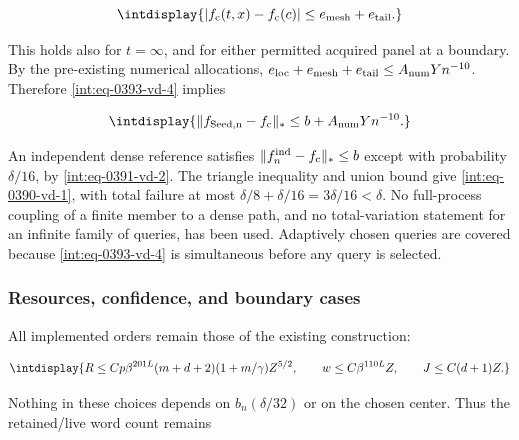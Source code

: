 \begingroup\renewcommand{\theHequation}{intdisplay.812}
\begin{equation*}
\intdisplay{
|f_{\rm c}(t,x)-f_{\rm c}(c)|\le e_{\rm mesh}+e_{\rm tail}.
}
\end{equation*}
\endgroup


This holds also for \(t=\infty\), and for either permitted acquired panel at a boundary. By the pre-existing numerical allocations, \(e_{\rm loc}+e_{\rm mesh}+e_{\rm tail} \le A_{\rm num}Yn^{-10}\). Therefore \eqref{int:eq-0393-vd-4} implies


\begingroup\renewcommand{\theHequation}{intdisplay.813}
\begin{equation*}
\intdisplay{
\|f_{\rm Seed,n}-f_{\rm c}\|_*
 \le b+A_{\rm num}Yn^{-10}.
}
\end{equation*}
\endgroup


An independent dense reference satisfies \(\|f_n^{\rm ind}-f_{\rm c}\|_*\le b\) except with probability \(\delta/16\), by \eqref{int:eq-0391-vd-2}. The triangle inequality and union bound give \eqref{int:eq-0390-vd-1}, with total failure at most \(\delta/8+\delta/16=3\delta/16<\delta\). No full-process coupling of a finite member to a dense path, and no total-variation statement for an infinite family of queries, has been used. Adaptively chosen queries are covered because \eqref{int:eq-0393-vd-4} is simultaneous before any query is selected.


\subsubsection{Resources, confidence, and boundary cases}



All implemented orders remain those of the existing construction:


\begingroup\renewcommand{\theHequation}{intdisplay.814}
\begin{equation*}
\intdisplay{
R\le Cp\beta^{201L}(m+d+2)(1+m/\gamma)Z^{5/2},\qquad
w\le C\beta^{110L}Z,\qquad J\le C(d+1)Z.
}
\end{equation*}
\endgroup


Nothing in these choices depends on \(b_n(\delta/32)\) or on the chosen center. Thus the retained/live word count remains


